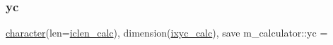 \mbox{\label{namespacem__calculator_a8ce138d24e6b41a29b5b6cec70e78086}} 
\subsubsection{\texorpdfstring{yc}{yc}}
{\footnotesize\ttfamily \hyperlink{option__stopwatch_83_8txt_abd4b21fbbd175834027b5224bfe97e66}{character}(len=\hyperlink{namespacem__calculator_accf705491e8bd9b3d2f0d04fd13712e7}{iclen\+\_\+calc}), dimension(\hyperlink{namespacem__calculator_a7f11fbca3121837187391693c8bf3f01}{ixyc\+\_\+calc}), save m\+\_\+calculator\+::yc =\textquotesingle{} \textquotesingle{}\hspace{0.3cm}{\ttfamily [private]}}

